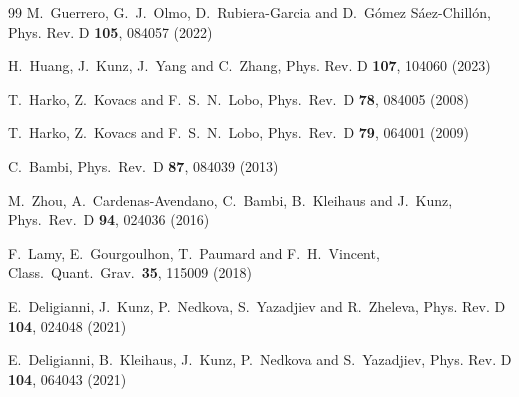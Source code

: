 \documentclass[aps,prd,12pt,superscriptaddress]{revtex4-2}
\begin{document}
\begin{thebibliography}{99}
M.~Guerrero, G.~J.~Olmo, D.~Rubiera-Garcia and D.~G\'omez S\'aez-Chill\'on,
Phys. Rev. D \textbf{105}, 084057 (2022)

H.~Huang, J.~Kunz, J.~Yang and C.~Zhang,
Phys. Rev. D \textbf{107}, 104060 (2023)

  T.~Harko, Z.~Kovacs and F.~S.~N.~Lobo,
  Phys.\ Rev.\ D {\bf 78}, 084005 (2008)

  T.~Harko, Z.~Kovacs and F.~S.~N.~Lobo,
  Phys.\ Rev.\ D {\bf 79}, 064001 (2009)

  C.~Bambi,
  Phys.\ Rev.\ D {\bf 87}, 084039 (2013)

  M.~Zhou, A.~Cardenas-Avendano, C.~Bambi, B.~Kleihaus and J.~Kunz,
  Phys.\ Rev.\ D {\bf 94}, 024036 (2016)

  F.~Lamy, E.~Gourgoulhon, T.~Paumard and F.~H.~Vincent,
  Class.\ Quant.\ Grav.\  {\bf 35}, 115009 (2018)

E.~Deligianni, J.~Kunz, P.~Nedkova, S.~Yazadjiev and R.~Zheleva,
Phys. Rev. D \textbf{104}, 024048 (2021)

E.~Deligianni, B.~Kleihaus, J.~Kunz, P.~Nedkova and S.~Yazadjiev,
Phys. Rev. D \textbf{104}, 064043 (2021)


\end{thebibliography}
\end{document}
